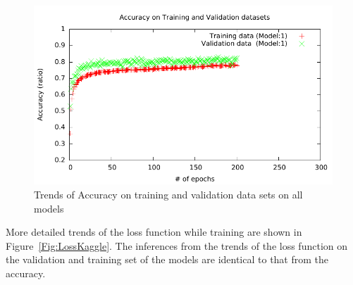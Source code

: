 \documentclass[]{article}
\begin{document}
\begin{figure}
\begin{minipage}{0.48\textwidth}
\end{minipage}
\hfill
\begin{minipage}{0.48\textwidth}
\includegraphics[scale=0.55, page=4]{Submissionlogs/LogAcc.pdf}
\end{minipage}
\caption{Trends of Accuracy on training and validation data sets on all models}
\label{Fig:AccKaggle}
\end{figure}

More detailed trends of the loss function while training are shown in Figure~\ref{Fig:LossKaggle}. The inferences from the trends of the loss function on the validation and training set of the models are identical to that from the accuracy. 
\end{document}
